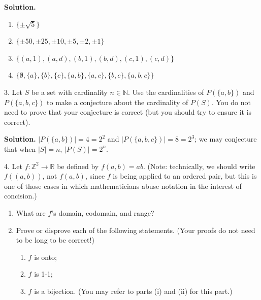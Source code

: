 \documentclass[10pt,]{book}
\theoremstyle{plain}
\theoremstyle{definition}
\theoremstyle{definition}
\theoremstyle{definition}
\theoremstyle{definition}
\numberwithin{equation}{section}
\def\Z{\mathbb{Z}}
\def\R{\mathbb{R}}
\def\N{\mathbb{N}}
\begin{document}
\begin{exerciselist}
\begin{enumerate}[label=(\alph*)]
\end{enumerate}
%
\par\smallskip
\par\smallskip
\noindent\textbf{Solution.}\hypertarget{solution-2}{}\quad
\leavevmode%
\begin{enumerate}[label=(\alph*)]
\item\hypertarget{li-35}{}\(\{\pm\sqrt{5}\}\)%
\item\hypertarget{li-36}{}\(\{\pm 50, \pm 25, \pm 10, \pm 5, \pm 2, \pm 1\}\)%
\item\hypertarget{li-37}{}\(\{(a,1),(a,d), (b,1),(b,d),(c,1),(c,d)\}\)%
\item\hypertarget{li-38}{}\(\{\emptyset, \{a\}, \{b\},
\{c\},\{a,b\},\{a,c\},\{b,c\}, \{a,b,c\}\}\)%
\end{enumerate}
\item[3.]\hypertarget{exercise-3}{}Let \(S\) be a set with cardinality \(n\in \N\). Use the cardinalities of \(P(\{a,b\})\) and \(P(\{a,b,c\})\) to make a conjecture about the cardinality of \(P(S)\). You do not need to prove that your conjecture is correct (but you should try to ensure it is correct).%
\par\smallskip
\par\smallskip
\noindent\textbf{Solution.}\hypertarget{solution-3}{}\quad
\(|P(\{a,b\})|=4=2^2\) and \(|P(\{a,b,c\})|=8=2^3\); we may conjecture that when \(|S|=n\), \(|P(S)|=2^n\).%
\item[4.]\hypertarget{exercise-4}{}Let \(f: \Z^2 \to \R\) be defined by \(f(a,b)=ab\). (Note: technically, we should write \(f((a,b))\), not \(f(a,b)\), since \(f\) is being applied to an ordered pair, but this is one of those cases in which mathematicians abuse notation in the interest of concision.)%
\leavevmode%
\begin{enumerate}[label=(\alph*)]
\item\hypertarget{li-39}{}What are \(f\)'s domain, codomain, and range?%
\item\hypertarget{li-40}{}Prove or disprove each of the following statements. (Your proofs do not need to be long to be correct!)%
%
\begin{enumerate}[label=\roman*.]
\item\hypertarget{li-41}{}\(f\) is onto;%
\item\hypertarget{li-42}{}\(f\) is 1-1;%
\item\hypertarget{li-43}{}\(f\) is a bijection. (You may refer to parts (i) and (ii) for this part.)%
\end{enumerate}

\end{enumerate}
\end{exerciselist}
\end{document}
